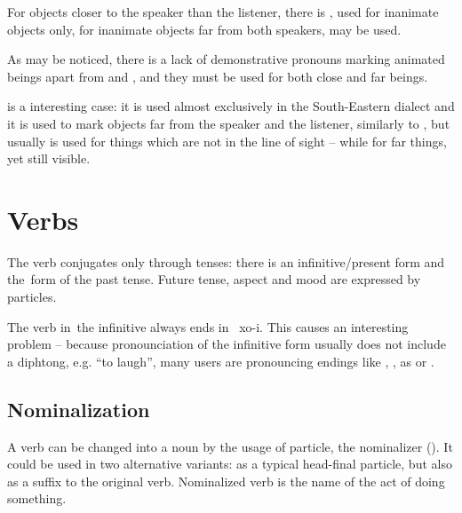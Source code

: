For objects closer to the speaker than the listener, there is , used
for inanimate objects only, for inanimate objects far from both speakers,
 may be used.

As may be noticed, there is a lack of demonstrative pronouns marking animated
beings apart from  and , and they must be used for both
close and far beings.


 is a interesting case: it is used almost exclusively in the
South-Eastern dialect and it is used to mark objects far from the speaker and
the listener, similarly to , but usually is used for things which
are not in the line of sight -- while  for far things, yet still
visible.

\section{Verbs}

The verb conjugates only through tenses: there is an infinitive/present form and
the~form of the past tense. Future tense, aspect and mood are expressed by
particles.

The verb in~the infinitive always ends in ~xo{-i}. This causes an interesting
problem -- because pronounciation of the infinitive form usually does not
include a diphtong, e.g.   ``to laugh'', many
users are pronouncing endings like , ,  as  or
.


\subsection{Nominalization}

A verb can be changed into a noun by the usage of  particle, the
nominalizer (\Nmlz{}). It could be used in two alternative variants: as a
typical head-final particle, but also as a suffix to the original verb.
Nominalized verb is the name of the act of doing something.

